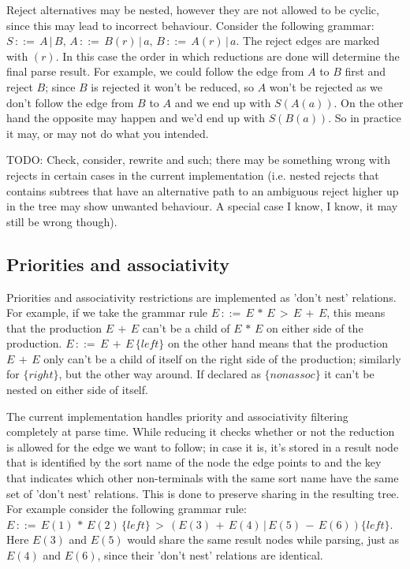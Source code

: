 \documentclass[a4paper,10pt]{article}
\begin{document}
Reject alternatives may be nested, however they are not allowed to be cyclic, since this may lead to incorrect behaviour. Consider the following grammar: $S\,::=\,A\,|\,B,\,A\,::=\,B(r)\,|\,a,\,B\,::=\,A(r)\,|\,a$. The reject edges are marked with $(r)$. In this case the order in which reductions are done will determine the final parse result. For example, we could follow the edge from $A$ to $B$ first and reject $B$; since $B$ is rejected it won't be reduced, so $A$ won't be rejected as we don't follow the edge from $B$ to $A$ and we end up with $S(A(a))$. On the other hand the opposite may happen and we'd end up with $S(B(a))$. So in practice it may, or may not do what you intended.

TODO: Check, consider, rewrite and such; there may be something wrong with rejects in certain cases in the current implementation (i.e. nested rejects that contains subtrees that have an alternative path to an ambiguous reject higher up in the tree may show unwanted behaviour. A special case I know, I know, it may still be wrong though).

\subsection{Priorities and associativity}

Priorities and associativity restrictions are implemented as 'don't nest' relations. For example, if we take the grammar rule $E\,::=\,E\,*\,E\,>\,E\,+\,E$, this means that the production $E\,+\,E$ can't be a child of $E\,*\,E$ on either side of the production. $E\,::=\,E\,+\,E\,\{left\}$ on the other hand means that the production $E\,+\,E$ only can't be a child of itself on the right side of the production; similarly for $\{right\}$, but the other way around. If declared as $\{nonassoc\}$ it can't be nested on either side of itself.

The current implementation handles priority and associativity filtering completely at parse time. While reducing it checks whether or not the reduction is allowed for the edge we want to follow; in case it is, it's stored in a result node that is identified by the sort name of the node the edge points to and the key that indicates which other non-terminals with the same sort name have the same set of 'don't nest' relations. This is done to preserve sharing in the resulting tree. For example consider the following grammar rule: $E\,::=\,E(1)\,*\,E(2)\,\{left\}\,>\,(E(3)\,+\,E(4)\,|\,E(5)\,-\,E(6))\{left\}$. Here $E(3)$ and $E(5)$ would share the same result nodes while parsing, just as $E(4)$ and $E(6)$, since their 'don't nest' relations are identical.
\end{document}
